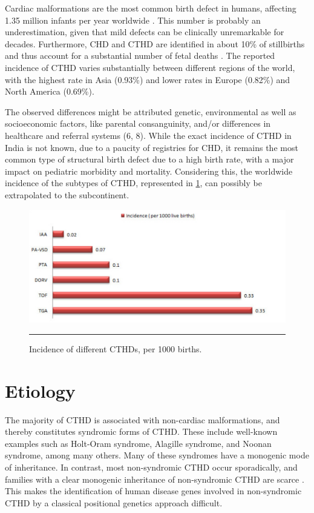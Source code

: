 \begin{refsection}
Cardiac malformations are the most common birth defect in humans, affecting 1.35 million infants per year worldwide \cite{van2011birth}. This number is probably an underestimation, given that mild defects can be clinically unremarkable for decades. Furthermore, CHD and CTHD are identified in about 10\% of stillbirths and thus account for a substantial number of fetal deaths \cite{hoffman1995incidence,fahed2013genetics}. The reported incidence of CTHD varies substantially between different regions of the world, with the highest rate in Asia (0.93\%) and lower rates in Europe (0.82\%) and North America (0.69\%). 

The observed differences might be attributed genetic, environmental as well as socioeconomic factors, like parental consanguinity, and/or differences in healthcare and referral systems (6, 8). While the exact incidence of CTHD in India is not known, due to a paucity of registries for CHD, it remains the most common type of structural birth defect due to a high birth rate, with a major impact on pediatric morbidity and mortality. Considering this, the worldwide incidence of the subtypes of CTHD, represented in \cref{fig:1_3}, can possibly be extrapolated to the subcontinent.

\begin{figure}[!htb]
\centering
\includegraphics[scale=0.65,keepaspectratio]{Figures/Figure1_3.pdf}
\rule{35em}{0.5pt}
\caption[Incidence of different CTHDs]{Incidence of different CTHDs, per 1000 births. \cite{hoffman1995incidence}}
\label{fig:1_3}
\end{figure}

\section{Etiology}

The majority of CTHD is associated with non-cardiac malformations, and thereby constitutes syndromic forms of CTHD. These include well-known examples such as Holt-Oram syndrome, Alagille syndrome, and Noonan syndrome, among many others. Many of these syndromes have a monogenic mode of inheritance. In contrast, most non-syndromic CTHD occur sporadically, and families with a clear monogenic inheritance of non-syndromic CTHD are scarce \cite{nora1968multifactorial,emanuel1970genetics,gill2003patterns,burn1998recurrence,oyen2009recurrence}. This makes the identification of human disease genes involved in non-syndromic CTHD by a classical positional genetics approach difficult. 


\end{refsection}
